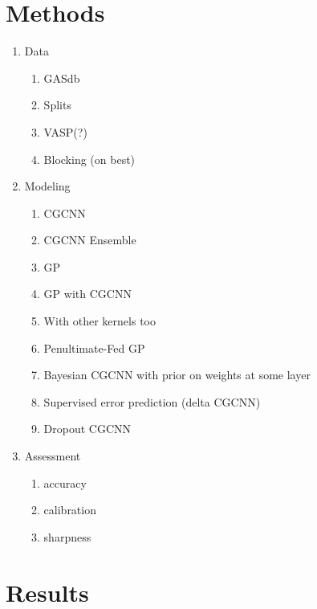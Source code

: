 \documentclass[]{achemso}
\begin{document}

\section{Methods}

\begin{enumerate}
    \item{Data}
        \begin{enumerate}
            \item{GASdb}
            \item{Splits}
            \item{VASP(?)}
            \item{Blocking (on best)}
        \end{enumerate}
    \item{Modeling}
        \begin{enumerate}
            \item{CGCNN}
            \item{CGCNN Ensemble}
            \item{GP}
            \item{GP with CGCNN}
            \item{With other kernels too}
            \item{Penultimate-Fed GP}
            \item{Bayesian CGCNN with prior on weights at some layer}
            \item{Supervised error prediction (delta CGCNN)}
            \item{Dropout CGCNN}
        \end{enumerate}
    \item{Assessment}
        \begin{enumerate}
            \item{accuracy}
            \item{calibration}
            \item{sharpness}
        \end{enumerate}
\end{enumerate}




\section{Results}
\end{document}
